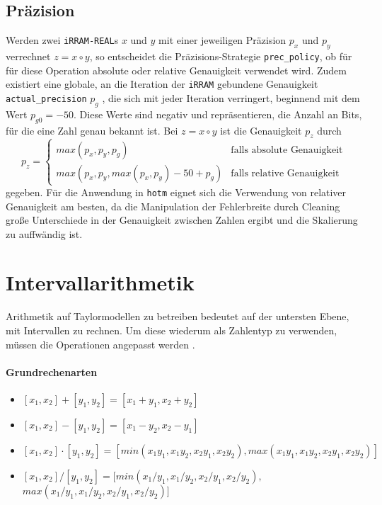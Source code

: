 \subsection{Präzision}
Werden zwei \verb+iRRAM-REAL+s $x$ und $y$ mit einer jeweiligen Präzision $p_x$ und $p_y$ verrechnet $z = x \circ y$, so entscheidet die Präzisions-Strategie \verb+prec_policy+, ob für für diese Operation absolute oder relative Genauigkeit verwendet wird. Zudem existiert eine globale, an die Iteration der \verb+iRRAM+ gebundene Genauigkeit \verb+actual_precision+ $p_g$ , die sich mit jeder Iteration verringert, beginnend mit dem Wert $p_{g0} = -50$. Diese Werte sind negativ und repräsentieren, die Anzahl an Bits, für die eine Zahl genau bekannt ist. Bei $z = x\circ y$ ist die Genauigkeit $p_z$ durch
$$p_z = \begin{cases}
         max(p_x, p_y, p_g) & \text{falls absolute Genauigkeit}\\
         max(p_x, p_y, max(p_x, p_y) - 50 + p_g) & \text{falls relative Genauigkeit}
        \end{cases}
$$
gegeben.
Für die Anwendung in \verb+hotm+ eignet sich die Verwendung von relativer Genauigkeit am besten, da die Manipulation der Fehlerbreite durch Cleaning große Unterschiede in der Genauigkeit zwischen Zahlen ergibt und die Skalierung zu auffwändig ist.



\section{Intervallarithmetik}
\label{sec:numint}
Arithmetik auf Taylormodellen zu betreiben bedeutet auf der untersten Ebene, mit Intervallen zu rechnen. Um diese wiederum als Zahlentyp zu verwenden, müssen die Operationen angepasst werden \cite{moore1979}.

\paragraph{Grundrechenarten}
\begin{itemize}
    \item[] $[x_1, x_2] + [y_1, y_2] = [x_1 + y_1, x_2 + y_2]$
    \item[] $[x_1, x_2] - [y_1, y_2] = [x_1 - y_2, x_2 - y_1]$
    \item[] $[x_1, x_2] \cdot [y_1, y_2] = [min(x_1 y_1, x_1 y_2, x_2 y_1, x_2 y_2), max(x_1 y_1, x_1 y_2, x_2 y_1, x_2 y_2)]$
    \item[] $[x_1, x_2] / [y_1, y_2] = [min(x_1 / y_1, x_1 / y_2, x_2 / y_1, x_2 / y_2),$\\ $max(x_1 /y_1, x_1 /y_2, x_2 /y_1, x_2 /y_2)]$
\end{itemize}
